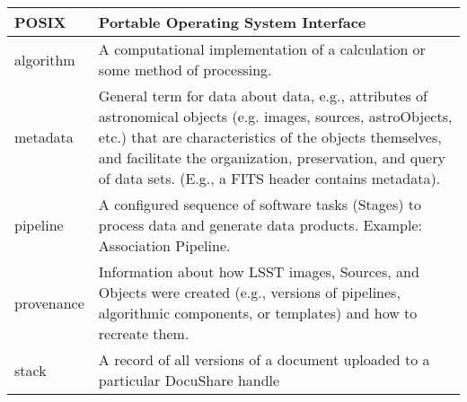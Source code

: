 \begin{longtable}{|l|p{}|}
POSIX & Portable Operating System Interface \\\hline
algorithm & A computational implementation of a calculation or some method of processing. \\\hline
metadata & General term for data about data, e.g., attributes of astronomical objects (e.g. images, sources, astroObjects, etc.) that are characteristics of the objects themselves, and facilitate the organization, preservation, and query of data sets. (E.g., a FITS header contains metadata). \\\hline
pipeline & A configured sequence of software tasks (Stages) to process data and generate data products. Example: Association Pipeline. \\\hline
provenance & Information about how LSST images, Sources, and Objects were created (e.g., versions of pipelines, algorithmic components, or templates) and how to recreate them. \\\hline
stack & A record of all versions of a document uploaded to a particular DocuShare handle \\\hline
\end{longtable}
